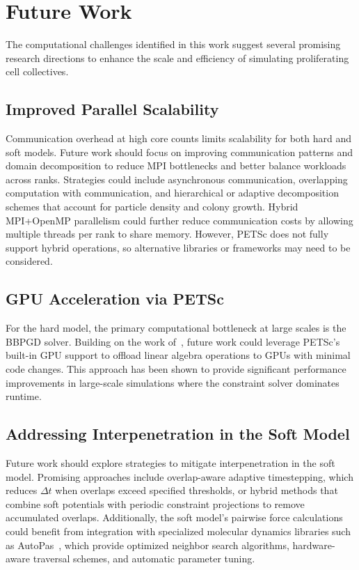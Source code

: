 \documentclass[conference]{IEEEtran}
\begin{document}
\section{Future Work}

The computational challenges identified in this work suggest several promising research directions to enhance the scale and efficiency of simulating proliferating cell collectives.

\subsection{Improved Parallel Scalability}

Communication overhead at high core counts limits scalability for both hard and soft models. Future work should focus on improving communication patterns and domain decomposition to reduce MPI bottlenecks and better balance workloads across ranks. Strategies could include asynchronous communication, overlapping computation with communication, and hierarchical or adaptive decomposition schemes that account for particle density and colony growth. Hybrid MPI+OpenMP parallelism could further reduce communication costs by allowing multiple threads per rank to share memory. However, PETSc does not fully support hybrid operations, so alternative libraries or frameworks may need to be considered.

\subsection{GPU Acceleration via PETSc}

For the hard model, the primary computational bottleneck at large scales is the BBPGD solver. Building on the work of~\cite{Tasora2008}, future work could leverage PETSc's built-in GPU support to offload linear algebra operations to GPUs with minimal code changes. This approach has been shown to provide significant performance improvements in large-scale simulations where the constraint solver dominates runtime.

\subsection{Addressing Interpenetration in the Soft Model}

Future work should explore strategies to mitigate interpenetration in the soft model. Promising approaches include overlap-aware adaptive timestepping, which reduces $\Delta t$ when overlaps exceed specified thresholds, or hybrid methods that combine soft potentials with periodic constraint projections to remove accumulated overlaps. Additionally, the soft model's pairwise force calculations could benefit from integration with specialized molecular dynamics libraries such as AutoPas~\cite{Gratl2019,Newcome2023}, which provide optimized neighbor search algorithms, hardware-aware traversal schemes, and automatic parameter tuning.
\end{document}
